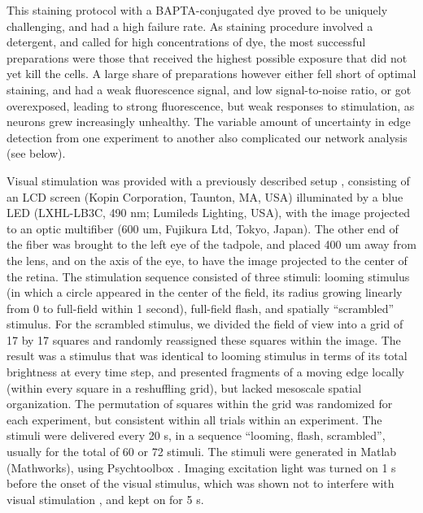 \documentclass{article}
\begin{document}
This staining protocol with a BAPTA-conjugated dye proved to be uniquely challenging, and had a high failure rate. As staining procedure involved a detergent, and called for high concentrations of dye, the most successful preparations were those that received the highest possible exposure that did not yet kill the cells. A large share of preparations however either fell short of optimal staining, and had a weak fluorescence signal, and low signal-to-noise ratio, or got overexposed, leading to strong fluorescence, but weak responses to stimulation, as neurons grew increasingly unhealthy. The variable amount of uncertainty in edge detection from one experiment to another also complicated our network analysis (see below).

Visual stimulation was provided with a previously described setup \citep{khakhalin2014}, consisting of an LCD screen (Kopin Corporation, Taunton, MA, USA) illuminated by a blue LED (LXHL-LB3C, 490 nm; Lumileds Lighting, USA), with the image projected to an optic multifiber (600 um, Fujikura Ltd, Tokyo, Japan). The other end of the fiber was brought to the left eye of the tadpole, and placed 400 um away from the lens, and on the axis of the eye, to have the image projected to the center of the retina. The stimulation sequence consisted of three stimuli: looming stimulus (in which a circle appeared in the center of the field, its radius growing linearly from 0 to full-field within 1 second), full-field flash, and spatially “scrambled” stimulus. For the scrambled stimulus, we divided the field of view into a grid of 17 by 17 squares and randomly reassigned these squares within the image. The result was a stimulus that was identical to looming stimulus in terms of its total brightness at every time step, and presented fragments of a moving edge locally (within every square in a reshuffling grid), but lacked mesoscale spatial organization. The permutation of squares within the grid was randomized for each experiment, but consistent within all trials within an experiment. The stimuli were delivered every 20 s, in a sequence “looming, flash, scrambled”, usually for the total of 60 or 72 stimuli. The stimuli were generated in Matlab (Mathworks), using Psychtoolbox \citep{kleiner2007psychtoolbox}. Imaging excitation light was turned on 1 s before the onset of the visual stimulus, which was shown not to interfere with visual stimulation \citep{xu2011}, and kept on for 5 s.
\end{document}
